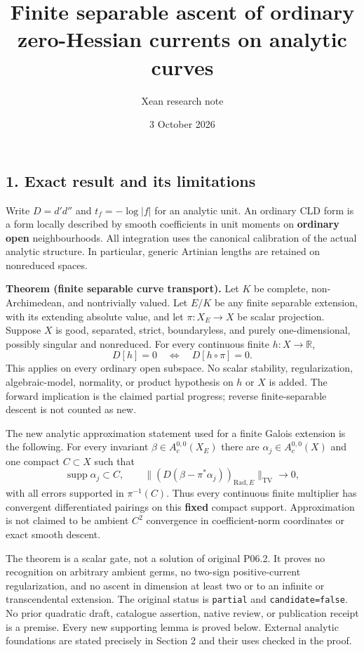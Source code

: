 \documentclass[11pt]{article}
\title{Finite separable ascent of ordinary zero-Hessian currents on
analytic curves}
\author{Xean research note}
\date{3 October 2026}
\begin{document}
\maketitle
\subsection{1. Exact result and its
limitations}\label{exact-result-and-its-limitations}

Write \(D=d'd''\) and \(t_f=-\log|f|\) for an analytic unit. An ordinary
CLD form is a form locally described by smooth coefficients in unit
moments on \textbf{ordinary open} neighbourhoods. All integration uses
the canonical calibration of the actual analytic structure. In
particular, generic Artinian lengths are retained on nonreduced spaces.

\textbf{Theorem (finite separable curve transport).} Let \(K\) be
complete, non-Archimedean, and nontrivially valued. Let \(E/K\) be any finite separable
extension, with its extending absolute value, and let
\(\pi:X_E\longrightarrow X\) be scalar projection. Suppose \(X\) is
good, separated, strict, boundaryless, and purely one-dimensional,
possibly singular and nonreduced. For every continuous finite
\(h:X\longrightarrow\mathbb R\), \[
                D[h]=0\quad\Longleftrightarrow\quad
                D[h\circ\pi]=0.                       \tag{1}
\] This applies on every ordinary open subspace. No scalar stability,
regularization, algebraic-model, normality, or product hypothesis on
\(h\) or \(X\) is added. The forward implication is the claimed partial
progress; reverse finite-separable descent is not counted as new.

The new analytic approximation statement used for a finite Galois
extension is the following. For every invariant
\(\beta\in A_c^{0,0}(X_E)\) there are \(\alpha_j\in A_c^{0,0}(X)\) and
one compact \(C\subset X\) such that \[
 \operatorname{supp}\alpha_j\subset C,\qquad
 \big\|(D(\beta-\pi^*\alpha_j))_{\mathrm{Rad},E}\big\|_{\mathrm{TV}}
                         \longrightarrow0,             \tag{2}
\] with all errors supported in \(\pi^{-1}(C)\). Thus every continuous
finite multiplier has convergent differentiated pairings on this
\textbf{fixed} compact support. Approximation is not claimed to be
ambient \(C^2\) convergence in coefficient-norm coordinates or exact
smooth descent.

The theorem is a scalar gate, not a solution of original P06.2. It
proves no recognition on arbitrary ambient germs, no two-sign
positive-current regularization, and no ascent in dimension at least two
or to an infinite or transcendental extension. The original status is
\texttt{partial} and \texttt{candidate=false}. No prior quadratic draft,
catalogue assertion, native review, or publication receipt is a premise.
Every new supporting lemma is proved below. External analytic
foundations are stated precisely in Section 2 and their uses checked in
the proof.
\end{document}

